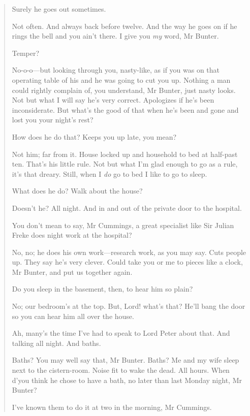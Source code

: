 \begin{quotation}
\begin{dialogue}
 Surely he goes out sometimes.

 Not often. And always back before twelve. And the way he goes on if he rings the bell and you ain't there. I give you \textit{my} word, Mr Bunter.

 Temper?

 No-o-o—but looking through you, nasty-like, as if you was on that operating table of his and he was going to cut you up. Nothing a man could rightly complain of, you understand, Mr Bunter, just nasty looks. Not but what I will say he's very correct. Apologizes if he's been inconsiderate. But what's the good of that when he's been and gone and lost you your night's rest?

 How does he do that? Keeps you up late, you mean?

 Not him; far from it. House locked up and household to bed at half-past ten. That's his little rule. Not but what I'm glad enough to go as a rule, it's that dreary. Still, when I \textit{do} go to bed I like to go to sleep.

 What does he do? Walk about the house?

 Doesn't he? All night. And in and out of the private door to the hospital.

 You don't mean to say, Mr Cummings, a great specialist like Sir Julian Freke does night work at the hospital?

 No, no; he does his own work—research work, as you may say. Cuts people up. They say he's very clever. Could take you or me to pieces like a clock, Mr Bunter, and put us together again.

 Do you sleep in the basement, then, to hear him so plain?

 No; our bedroom's at the top. But, Lord! what's that? He'll bang the door so you can hear him all over the house.

 Ah, many's the time I've had to speak to Lord Peter about that. And talking all night. And baths.

 Baths? You may well say that, Mr Bunter. Baths? Me and my wife sleep next to the cistern-room. Noise fit to wake the dead. All hours. When d'you think he chose to have a bath, no later than last Monday night, Mr Bunter?

 I've known them to do it at two in the morning, Mr Cummings.


\end{dialogue}
\end{quotation}
